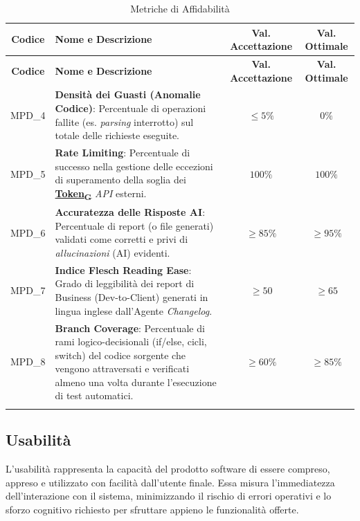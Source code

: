 \documentclass[12pt, a4paper]{article}
\newcommand{\urlglossario}{https://skynetunigroup.github.io/Code_Guardian/Documentazione/PB/glossario_v2.0.0.pdf} %
\newcommand{\glo}[2]{\href{\urlglossario\#nameddest=#2}{#1\textsubscript{G}}}
\newlength{\LargColVal} %
\begin{document}
\renewcommand{\arraystretch}{1.3}
\begin{xltabular}{\textwidth}{|c|X|C{\LargColVal}|C{\LargColVal}|}

    \hline
    \textbf{Codice} & \textbf{Nome e Descrizione} & \textbf{Val. Accettazione} & \textbf{Val. Ottimale} \\ \hline
    \endfirsthead

    \hline
    \textbf{Codice} & \textbf{Nome e Descrizione} & \textbf{Val. Accettazione} & \textbf{Val. Ottimale} \\ \hline
    \endhead

    MPD\_4 & \textbf{Densità dei Guasti (Anomalie Codice)}: Percentuale di operazioni fallite (es. \textit{parsing} interrotto) sul totale delle richieste eseguite. & $\le 5\%$ & $0\%$ \\ \hline
    MPD\_5 & \textbf{Rate Limiting}: Percentuale di successo nella gestione delle eccezioni di superamento della soglia dei \textbf{\glo{Token}{token}} \textit{API} esterni. & $100\%$ & $100\%$ \\ \hline
    MPD\_6 & \textbf{Accuratezza delle Risposte AI}: Percentuale di report (o file generati) validati come corretti e privi di \textit{allucinazioni} (AI) evidenti. & $\ge 85\%$ & $\ge 95\%$ \\ \hline
    MPD\_7 & \textbf{Indice Flesch Reading Ease}: Grado di leggibilità dei report di Business (Dev-to-Client) generati in lingua inglese dall'Agente \textit{Changelog}. & $\ge 50$ & $\ge 65$ \\ \hline
    MPD\_8 & \textbf{Branch Coverage}: Percentuale di rami logico-decisionali (if/else, cicli, switch) del codice sorgente che vengono attraversati e verificati almeno una volta durante l'esecuzione di test automatici. & $\ge 60\%$ & $\ge 85\%$ \\ \hline

    \caption{Metriche di Affidabilità}
    \label{tab:prod_affidabilita}
\end{xltabular}

\subsection{Usabilità}
L'usabilità rappresenta la capacità del prodotto software di essere compreso, appreso e utilizzato con facilità dall'utente finale. Essa misura l'immediatezza dell'interazione con il sistema, minimizzando il rischio di errori operativi e lo sforzo cognitivo richiesto per sfruttare appieno le funzionalità offerte.
\end{document}
